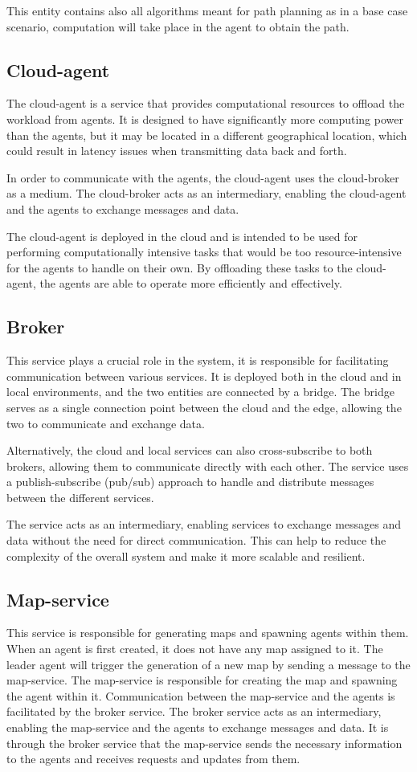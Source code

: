 This entity contains also all algorithms meant for path planning as in a base case scenario, computation will take place in the agent to obtain the path.

\subsection{Cloud-agent}
The cloud-agent is a service that provides computational resources to offload the workload from agents. It is designed to have significantly more computing power than the agents, but it may be located in a different geographical location, which could result in latency issues when transmitting data back and forth.

In order to communicate with the agents, the cloud-agent uses the cloud-broker as a medium. The cloud-broker acts as an intermediary, enabling the cloud-agent and the agents to exchange messages and data.

The cloud-agent is deployed in the cloud and is intended to be used for performing computationally intensive tasks that would be too resource-intensive for the agents to handle on their own. By offloading these tasks to the cloud-agent, the agents are able to operate more efficiently and effectively.

\subsection{Broker}
This service plays a crucial role in the system, it is responsible for facilitating communication between various services. It is deployed both in the cloud and in local environments, and the two entities are connected by a bridge. The bridge serves as a single connection point between the cloud and the edge, allowing the two to communicate and exchange data.

Alternatively, the cloud and local services can also cross-subscribe to both brokers, allowing them to communicate directly with each other. The service uses a publish-subscribe (pub/sub) approach to handle and distribute messages between the different services.

The service acts as an intermediary, enabling services to exchange messages and data without the need for direct communication. This can help to reduce the complexity of the overall system and make it more scalable and resilient.

\subsection{Map-service}
This service is responsible for generating maps and spawning agents within them. When an agent is first created, it does not have any map assigned to it. The leader agent will trigger the generation of a new map by sending a message to the map-service. The map-service is responsible for creating the map and spawning the agent within it. Communication between the map-service and the agents is facilitated by the broker service. The broker service acts as an intermediary, enabling the map-service and the agents to exchange messages and data. It is through the broker service that the map-service sends the necessary information to the agents and receives requests and updates from them.

